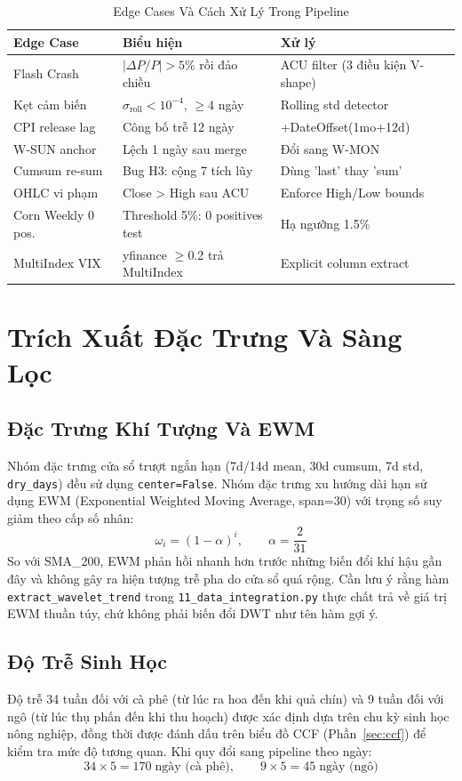 \documentclass[conference]{IEEEtran}
\begin{document}
\begin{table}[t]
\caption{Edge Cases Và Cách Xử Lý Trong Pipeline}
\label{tab:edge_cases}
\centering
\begin{tabular}{@{}p{1.5cm}p{2.5cm}p{3.5cm}@{}}
\toprule
\textbf{Edge Case} & \textbf{Biểu hiện} & \textbf{Xử lý} \\
\midrule
Flash Crash & $|\Delta P/P| > 5\%$ rồi đảo chiều & ACU filter (3 điều kiện V-shape) \\
Kẹt cảm biến & $\sigma_\text{roll} < 10^{-4}$, $\geq 4$ ngày & Rolling std detector \\
CPI release lag & Công bố trễ 12 ngày & +DateOffset(1mo+12d) \\
W-SUN anchor & Lệch 1 ngày sau merge & Đổi sang W-MON \\
Cumsum re-sum & Bug H3: cộng 7 tích lũy & Dùng 'last' thay 'sum' \\
OHLC vi phạm & Close > High sau ACU & Enforce High/Low bounds \\
Corn Weekly 0 pos. & Threshold 5\%: 0 positives test & Hạ ngưỡng 1.5\% \\
MultiIndex VIX & yfinance $\geq$0.2 trả MultiIndex & Explicit column extract \\
\bottomrule
\end{tabular}
\end{table}
\section{Trích Xuất Đặc Trưng Và Sàng Lọc}
\subsection{Đặc Trưng Khí Tượng Và EWM}
Nhóm đặc trưng cửa sổ trượt ngắn hạn (7d/14d mean, 30d cumsum, 7d std,
\texttt{dry\_days}) đều sử dụng \texttt{center=False}.
Nhóm đặc trưng xu hướng dài hạn sử dụng EWM (Exponential Weighted Moving
Average, span=30) với trọng số suy giảm theo cấp số nhân:
\begin{equation}
\omega_i = (1-\alpha)^i, \qquad \alpha = \frac{2}{31}
\label{eq:ewm}
\end{equation}
So với SMA\_200, EWM phản hồi nhanh hơn trước những biến đổi khí hậu gần đây
và không gây ra hiện tượng trễ pha do cửa sổ quá rộng. Cần lưu ý rằng hàm
\texttt{extract\_wavelet\_trend} trong \texttt{11\_data\_integration.py} thực
chất trả về giá trị EWM thuần túy, chứ không phải biến đổi DWT như tên hàm
gợi ý.
\subsection{Độ Trễ Sinh Học}
Độ trễ 34 tuần đối với cà phê (từ lúc ra hoa đến khi quả chín) và 9 tuần đối
với ngô (từ lúc thụ phấn đến khi thu hoạch) được xác định dựa trên chu kỳ
sinh học nông nghiệp, đồng thời được đánh dấu trên biểu đồ CCF
(Phần~\ref{sec:ccf}) để kiểm tra mức độ tương quan. Khi quy đổi sang pipeline
theo ngày:
\begin{equation}
34 \times 5 = 170 \;\text{ngày (cà phê)}, \qquad
9 \times 5 = 45 \;\text{ngày (ngô)}
\label{eq:lag_days}
\end{equation}
\end{document}
